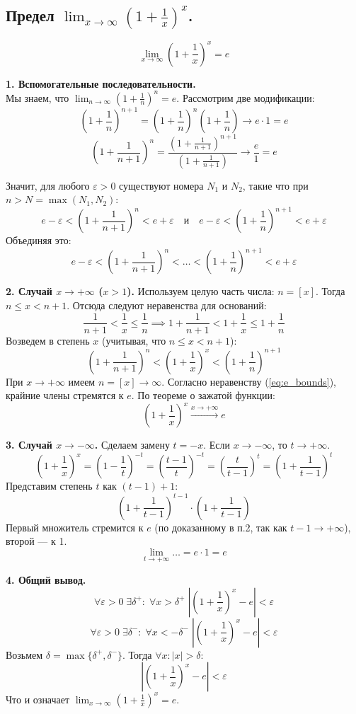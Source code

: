 \subsection{Предел $\lim_{x\to\infty} (1 + \frac{1}{x})^x$.}
\[ \lim_{x\to\infty} \left(1 + \frac{1}{x}\right)^x = e \]

\begin{tcolorbox}[title=Доказательство]
	\textbf{1. Вспомогательные последовательности.}\\
	Мы знаем, что $\lim_{n\to\infty} (1+\frac{1}{n})^n = e$. Рассмотрим две модификации:
	\[ \left(1 + \frac{1}{n}\right)^{n+1} = \left(1 + \frac{1}{n}\right)^{n}\left(1 + \frac{1}{n}\right) \to e \cdot 1 = e \]
	\[ \left(1 + \frac{1}{n + 1}\right)^{n} = \frac{\left(1 + \frac{1}{n+1}\right)^{n+1}}{\left(1 + \frac{1}{n+1}\right)} \to \frac{e}{1} = e \]
	
	Значит, для любого $\varepsilon > 0$ существуют номера $N_1$ и $N_2$, такие что при $n > N = \max(N_1, N_2)$:
	\[ e - \varepsilon < \left(1 + \frac{1}{n+1}\right)^{n} < e + \varepsilon \quad \text{и} \quad e - \varepsilon < \left(1 + \frac{1}{n}\right)^{n+1} < e + \varepsilon \]
	Объединяя это:
	\begin{equation}\label{eq:e_bounds}
		e - \varepsilon < \left(1 + \frac{1}{n+1}\right)^{n} < \dots < \left(1 + \frac{1}{n}\right)^{n+1} < e + \varepsilon
	\end{equation}

	\textbf{2. Случай $x \to +\infty$ ($x > 1$).}
	Используем целую часть числа: $n = [x]$. Тогда $n \le x < n+1$.
	Отсюда следуют неравенства для оснований:
	\[ \frac{1}{n+1} < \frac{1}{x} \le \frac{1}{n} \implies 1 + \frac{1}{n+1} < 1 + \frac{1}{x} \le 1 + \frac{1}{n} \]
	Возведем в степень $x$ (учитывая, что $n \le x < n+1$):
	\[ \left(1 + \frac{1}{n + 1}\right)^{n} < \left(1 + \frac{1}{x}\right)^{x} < \left(1 + \frac{1}{n}\right)^{n+1} \]
	При $x \to +\infty$ имеем $n = [x] \to \infty$. Согласно неравенству (\ref{eq:e_bounds}), крайние члены стремятся к $e$.
	По теореме о зажатой функции:
	\[ \left(1 + \frac{1}{x}\right)^{x} \xrightarrow[]{x\to+\infty} e \]

	\textbf{3. Случай $x \to -\infty$.}
	Сделаем замену $t = -x$. Если $x \to -\infty$, то $t \to +\infty$.
	\[ \left(1 + \frac{1}{x}\right)^{x} = \left(1 - \frac{1}{t}\right)^{-t} = \left(\frac{t-1}{t}\right)^{-t} = \left(\frac{t}{t - 1}\right)^t = \left(1 + \frac{1}{t-1}\right)^{t} \]
	Представим степень $t$ как $(t-1) + 1$:
	\[ \left(1 + \frac{1}{t-1}\right)^{t-1} \cdot \left(1 + \frac{1}{t-1}\right) \]
	Первый множитель стремится к $e$ (по доказанному в п.2, так как $t-1 \to +\infty$), второй — к 1.
	\[ \lim_{t\to +\infty} \dots = e \cdot 1 = e \]

	\textbf{4. Общий вывод.}
	\[ \forall \varepsilon > 0\; \exists \delta^+: \;\forall x > \delta^+\; \left|\left(1 + \frac{1}{x}\right)^{x} - e\right| < \varepsilon \]
	\[ \forall \varepsilon > 0\; \exists \delta^-: \;\forall x < -\delta^-\; \left|\left(1 + \frac{1}{x}\right)^{x} - e\right| < \varepsilon \]
	Возьмем $\delta = \max\{ \delta^+, \delta^- \}$. Тогда $\forall x: |x| > \delta$:
	\[ \left|\left(1 + \frac{1}{x}\right)^{x} - e\right| < \varepsilon \]
	Что и означает $\lim_{x\to\infty} \left(1 + \frac{1}{x}\right)^x = e$.
\end{tcolorbox}
